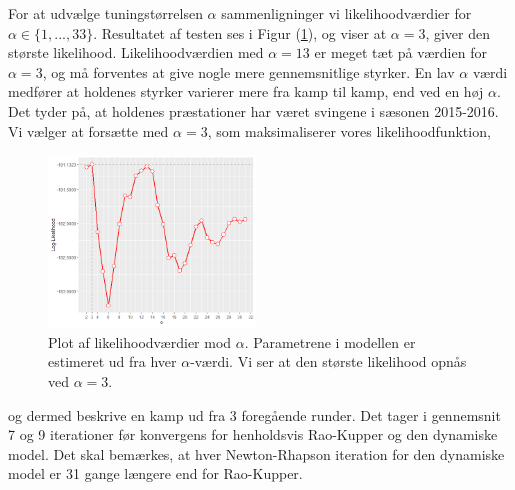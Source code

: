 \documentclass[11pt,a4paper]{article}
\begin{document}
\par For at udvælge tuningstørrelsen $\alpha$ sammenligninger vi likelihoodværdier for $\alpha \in \{1,...,33\}$. Resultatet af testen ses i Figur (\ref{fig:AlphaPlot}), og viser at $\alpha=3$, giver den største likelihood. Likelihoodværdien med $\alpha=13$ er meget tæt på værdien for $\alpha=3$, og må forventes at give nogle mere gennemsnitlige styrker. En lav $\alpha$ værdi medfører at holdenes styrker varierer mere fra kamp til kamp, end ved en høj $\alpha$. Det tyder på, at holdenes præstationer har været svingene i sæsonen 2015-2016. Vi vælger at forsætte med $\alpha=3$, som maksimaliserer vores likelihoodfunktion,
\begin{figure}[htb!]
\begin{center}
    \includegraphics[width=0.49\textwidth]{AlphaBestPlot.png}
    \caption{Plot af likelihoodværdier mod $\alpha$. Parametrene i modellen er estimeret ud fra hver $\alpha$-værdi. Vi ser at den største likelihood opnås ved $\alpha=3$. }
    \label{fig:AlphaPlot}
\end{center}
\end{figure}
  og dermed beskrive en kamp ud fra 3 foregående runder. Det tager i gennemsnit 7 og 9 iterationer før konvergens for henholdsvis Rao-Kupper og den dynamiske model. Det skal bemærkes, at hver Newton-Rhapson iteration for den dynamiske model er 31 gange længere end for Rao-Kupper. 
\end{document}
